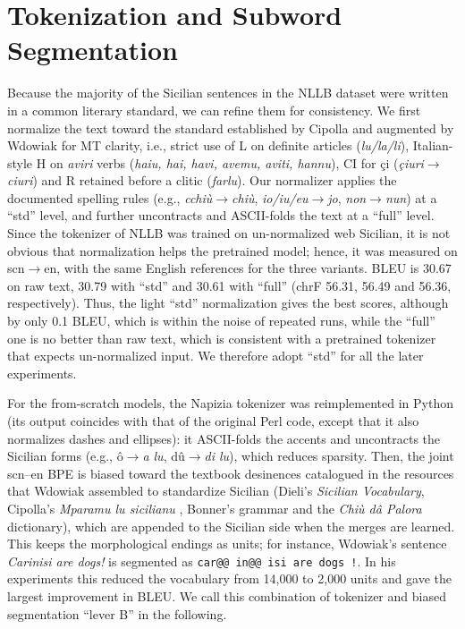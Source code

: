 \documentclass[11pt,a4paper]{article}
\begin{document}


\section{Tokenization and Subword Segmentation}
\label{sec:tokenization}
Because the majority of the Sicilian sentences in the NLLB dataset were
written in a common literary standard, we can refine them for consistency.
We first normalize the text toward
the standard established by Cipolla and augmented by Wdowiak for MT clarity,
i.e., strict use of L on definite articles (\emph{lu/la/li}),
Italian-style H on \emph{aviri} verbs (\emph{haiu, hai, havi, avemu, aviti, hannu}),
CI for \c ci (\emph{\c ciuri$\to$ciuri})
and R retained before a clitic (\emph{farlu}).
Our normalizer applies the documented spelling rules
(e.g., \emph{cchi\`u$\to$chi\`u}, \emph{io/iu/eu$\to$jo},
\emph{non$\to$nun}) at a ``std'' level, and further uncontracts and ASCII-folds the text at a
``full'' level. Since the tokenizer of NLLB was trained on un-normalized web Sicilian, it is not
obvious that normalization helps the pretrained model; hence, it was measured on
scn$\rightarrow$en, with the same English references for the three variants. BLEU is 30.67 on raw
text, 30.79 with ``std'' and 30.61 with ``full'' (chrF 56.31, 56.49 and 56.36, respectively).
Thus, the light ``std'' normalization gives the best scores, although by only 0.1 BLEU, which is within the
noise of repeated runs, while the ``full'' one is no better than raw text, which is consistent with a pretrained tokenizer
that expects un-normalized input. We therefore adopt ``std'' for all the later experiments.

For the from-scratch models, the Napizia tokenizer was reimplemented in Python (its output
coincides with that of the original Perl code, except that it also normalizes dashes and ellipses): it ASCII-folds the accents and uncontracts the
Sicilian forms (e.g., \^o$\to$\emph{a lu}, d\^u$\to$\emph{di lu}), which reduces sparsity. Then,
the joint scn--en BPE \citep{sennrich2016subword} is biased toward the textbook desinences
catalogued in the resources that Wdowiak assembled to standardize Sicilian (Dieli's
\emph{Sicilian Vocabulary}, Cipolla's \emph{Mparamu lu sicilianu} \citep{cipolla2013}, Bonner's
grammar \citep{bonner2001} and the \emph{Chi\`u d\^a Palora} dictionary), which are appended to
the Sicilian side when the merges are learned. This keeps the morphological endings as units; for
instance, Wdowiak's sentence \emph{Carinisi are dogs!} is segmented as
\texttt{car@@ in@@ isi are dogs !}. In his experiments this reduced the vocabulary from 14{,}000
to 2{,}000 units and gave the largest improvement in BLEU. We call this combination of tokenizer
and biased segmentation ``lever B'' in the following.
\end{document}
